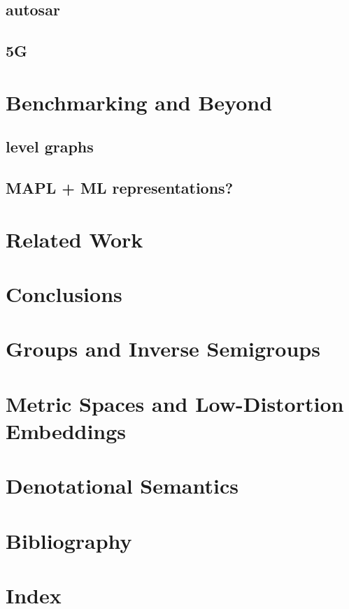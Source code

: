 \documentclass{report}
\begin{document}
\section{autosar}
\section{5G}

\chapter{Benchmarking and Beyond}
\section{level graphs}
\section{MAPL + ML representations?}

\chapter{Related Work}


\chapter{Conclusions} 

\appendix
\chapter{Groups and Inverse Semigroups}
\label{appendix:groups}

\chapter{Metric Spaces and Low-Distortion Embeddings}
\label{appendix:metric}

\chapter{Denotational Semantics}
\label{appendix:semantics}


\clearpage
\chapter*{Bibliography} 
\clearpage
\chapter*{Index} 
\end{document}
